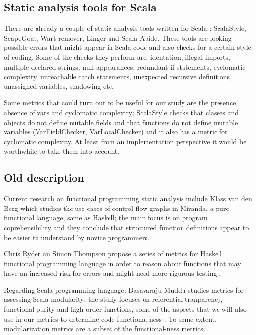 \documentclass{article}
\begin{document}
\subsection {Static analysis tools for Scala}
There are already a couple of static analysis tools written for Scala : ScalaStyle, ScapeGoat, Wart remover, Linger and Scala Abide. These tools are looking possible errors that might appear in Scala code and also checks for a certain style of coding. Some of the checks they perform are: identation, illegal imports, multiple declared strings, null appearances, redundant if statements, cyclomatic complexity, unreachable catch statements, unexpected recursive definitions, unassigned variables, shadowing etc. \par

Some metrics that could turn out to be useful for our study are  the presence, absence of vars and cyclomatic complexity; ScalaStyle checks that classes and objects do not define mutable fields and that functions do not define mutable variables (VarFieldChecker, VarLocalChecker) \cite{scalastyle} and it also has a metric for cyclomatic complexity. At least from an implementation perspective it would be worthwhile to take them into account.\par

\subsection{Old description}

Current research on functional programming static analysis include Klass van den Berg \cite{DBLP:journals/infsof/BergB95} which studies the use cases of control-flow graphs in Miranda, a pure functional language, same as Haskell; the main focus is on program coprehensibility and they conclude that structured function definitions appear to be easier to understand by novice programmers. \par

Chris Ryder an Simon Thompson propose a series of metrics for Haskell functional programming language in order to reason about functions that may have an increased risk for errors and might need more rigurous testing \cite{RyderT05:TFP_2005_Intellect}. \par

Regarding Scala programming language, Basavaraju Muddu studies metrics for assessing Scala modularity; the study focuses on referential tranparency, functional purity and high order functions, some of the aspects that we will also use in our metrics to determine code functional-ness \cite{DBLP:conf/icse/MudduABP13}. To some extent, modularization metrics are a subset of the functional-ness metrics. \par
\end{document}
